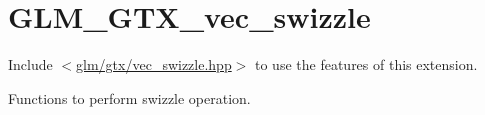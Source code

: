\hypertarget{group__gtx__vec__swizzle}{}\section{G\+L\+M\+\_\+\+G\+T\+X\+\_\+vec\+\_\+swizzle}
\label{group__gtx__vec__swizzle}
Include $<$\mbox{\hyperlink{vec__swizzle_8hpp}{glm/gtx/vec\+\_\+swizzle.\+hpp}}$>$ to use the features of this extension.

Functions to perform swizzle operation. 
